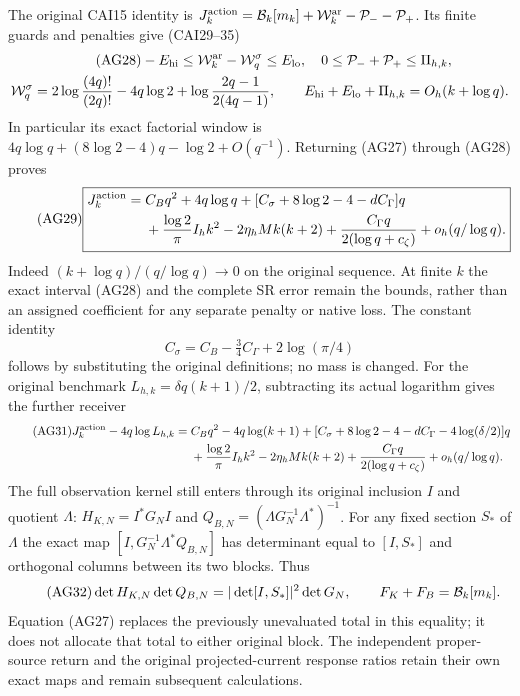 \documentclass[11pt,a4paper]{article}
\begin{document}
The original CAI15 identity is
$J_k^{\rm action}=\mathcal B_k[m_k]+\mathcal W_k^{\rm ar}-\mathcal P_--\mathcal P_+$.
Its finite guards and penalties give (CAI29--35)
\begin{gather}\tag{AG28}
 -E_{\rm hi}\le\mathcal W_k^{\rm ar}-\mathcal W_q^\sigma\le E_{\rm lo},
 \quad0\le\mathcal P_-+\mathcal P_+\le\Pi_{h,k},\\
 \mathcal W_q^\sigma=2\log\frac{(4q)!}{(2q)!}-4q\log2
       +\log\frac{2q-1}{2(4q-1)},\qquad
 E_{\rm hi}+E_{\rm lo}+\Pi_{h,k}=O_h(k+\log q).\notag
\end{gather}
In particular its exact factorial window is
$4q\log q+(8\log2-4)q-\log2+O(q^{-1})$.
Returning (AG27) through (AG28) proves
\begin{equation}\tag{AG29}
 \boxed{\begin{aligned}J_k^{\rm action}={}&C_Bq^2+4q\log q
  +[C_\sigma+8\log2-4-dC_\Gamma]q\\
 &+\frac{\log2}{\pi}I_hk^2-2\eta_hMk(k+2)
  +\frac{C_\Gamma q}{2(\log q+c_\zeta)}+o_h(q/\log q).
 \end{aligned}}
\end{equation}
Indeed $(k+\log q)/(q/\log q)\to0$ on the original sequence. At finite $k$
the exact interval (AG28) and the complete SR error remain the bounds,
rather than an assigned coefficient for any separate penalty or native loss.
The constant identity
\begin{equation}\tag{AG30}
 C_\sigma=C_B-\tfrac34 C_\Gamma+2\log(\pi/4)
\end{equation}
follows by substituting the original definitions; no mass is changed.
For the original benchmark $L_{h,k}=\delta q(k+1)/2$, subtracting its
actual logarithm gives the further receiver
\begin{align}\tag{AG31}
 J_k^{\rm action}-4q\log L_{h,k}
 ={}&C_Bq^2-4q\log(k+1)
 +[C_\sigma+8\log2-4-dC_\Gamma-4\log(\delta/2)]q\\
 &+\frac{\log2}{\pi}I_hk^2-2\eta_hMk(k+2)
 +\frac{C_\Gamma q}{2(\log q+c_\zeta)}+o_h(q/\log q).\notag
\end{align}
The full observation kernel still enters through its original inclusion
$I$ and quotient $\Lambda$: $H_{K,N}=I^*G_NI$ and
$Q_{B,N}=(\Lambda G_N^{-1}\Lambda^*)^{-1}$.
For any fixed section $S_*$ of $\Lambda$ the exact map
$[I,G_N^{-1}\Lambda^*Q_{B,N}]$ has determinant equal to $[I,S_*]$ and
orthogonal columns between its two blocks. Thus
\begin{equation}\tag{AG32}
 \det H_{K,N}\det Q_{B,N}=|\det[I,S_*]|^2\det G_N,
 \qquad F_K+F_B=\mathcal B_k[m_k].
\end{equation}
Equation (AG27) replaces the previously unevaluated total in this equality;
it does not allocate that total to either original block. The independent
proper-source return and the original projected-current response ratios
retain their own exact maps and remain subsequent calculations.
\end{document}
